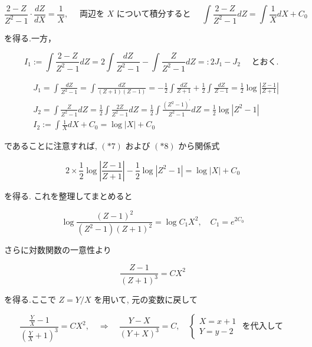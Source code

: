 \documentclass[10pt]{article}
\begin{document}
\begin{equation*}
\frac{2-Z}{Z^{2}-1} \cdot \frac{d Z}{d X}=\frac{1}{X}, \quad \text { 両辺を } X \text { について積分すると } \quad \int \frac{2-Z}{Z^{2}-1} d Z=\int \frac{1}{X} d X+C_{0} \tag{*7}
\end{equation*}


を得る.一方，


\begin{equation*}
I_{1}:=\int \frac{2-Z}{Z^{2}-1} d Z=2 \int \frac{d Z}{Z^{2}-1}-\int \frac{Z}{Z^{2}-1} d Z=: 2 J_{1}-J_{2} \quad \text { とおく. } \tag{*8}
\end{equation*}


$$
\begin{aligned}
& J_{1}=\int \frac{d Z}{Z^{2}-1}=\int \frac{d Z}{(Z+1)(Z-1)}=-\frac{1}{2} \int \frac{d Z}{Z+1}+\frac{1}{2} \int \frac{d Z}{Z-1}=\frac{1}{2} \log \left|\frac{Z-1}{Z+1}\right| \\
& J_{2}=\int \frac{Z}{Z^{2}-1} d Z=\frac{1}{2} \int \frac{2 Z}{Z^{2}-1} d Z=\frac{1}{2} \int \frac{\left(Z^{2}-1\right)^{\prime}}{Z^{2}-1} d Z=\frac{1}{2} \log \left|Z^{2}-1\right| \\
& I_{2}:=\int \frac{1}{X} d X+C_{0}=\log |X|+C_{0}
\end{aligned}
$$

であることに注意すれば, $(* 7)$ および $(* 8)$ から関係式


\begin{equation*}
2 \times \frac{1}{2} \log \left|\frac{Z-1}{Z+1}\right|-\frac{1}{2} \log \left|Z^{2}-1\right|=\log |X|+C_{0} \tag{*9}
\end{equation*}


を得る. これを整理してまとめると

$$
\log \frac{(Z-1)^{2}}{\left(Z^{2}-1\right)(Z+1)^{2}}=\log C_{1} X^{2}, \quad C_{1}=e^{2 C_{0}}
$$

さらに対数関数の一意性より


\begin{equation*}
\frac{Z-1}{(Z+1)^{3}}=C X^{2} \tag{*10}
\end{equation*}


を得る.ここで $Z=Y / X$ を用いて, 元の変数に戻して

$$
\frac{\frac{Y}{X}-1}{\left(\frac{Y}{X}+1\right)^{3}}=C X^{2}, \quad \Longrightarrow \quad \frac{Y-X}{(Y+X)^{3}}=C, \quad\left\{\begin{array}{l}
X=x+1 \\
Y=y-2
\end{array}\right. \text { を代入して }
$$
\end{document}
